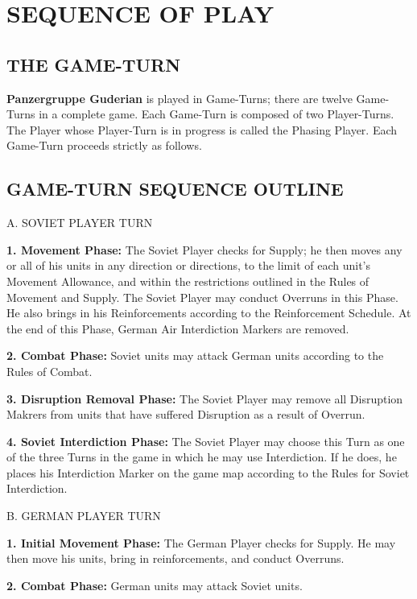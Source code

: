 \section{SEQUENCE OF PLAY}

\subsection{THE GAME-TURN}

\textbf{Panzergruppe Guderian} is played in Game-Turns; there are twelve Game-Turns in a complete game. Each Game-Turn is composed of two Player-Turns. The Player whose Player-Turn is in progress is called the Phasing Player. Each Game-Turn proceeds strictly as follows.

\begin{flushleft}
  \subsection{GAME-TURN SEQUENCE OUTLINE}
\end{flushleft}

A. SOVIET PLAYER TURN

\textbf{1. Movement Phase:} The Soviet Player checks for Supply; he then moves any or all of his units in any direction or directions, to the limit of each unit's Movement Allowance, and within the restrictions outlined in the Rules of Movement and Supply. The Soviet Player may conduct Overruns in this Phase. He also brings in his Reinforcements according to the Reinforcement Schedule. At the end of this Phase, German Air Interdiction Markers are removed.

\textbf{2. Combat Phase:} Soviet units may attack German units according to the Rules of Combat.

\textbf{3. Disruption Removal Phase:} The Soviet Player may remove all Disruption Makrers from units that have suffered Disruption as a result of Overrun.

\textbf{4. Soviet Interdiction Phase:} The Soviet Player may choose this Turn as one of the three Turns in the game in which he may use Interdiction. If he does, he places his Interdiction Marker on the game map according to the Rules for Soviet Interdiction.

B. GERMAN PLAYER TURN

\textbf{1. Initial Movement Phase:} The German Player checks for Supply. He may then move his units, bring in reinforcements, and conduct Overruns.

\textbf{2. Combat Phase:} German units may attack Soviet units.

